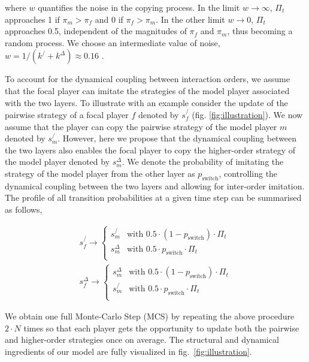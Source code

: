 \documentclass[a4paper,pre,reqno,superscriptaddress,twocolumn, floatfix]{revtex4}
\begin{document}
where $w$ quantifies the noise in the copying process. In the limit $w \rightarrow \infty$, $\Pi_t$ approaches 1 if $\pi_m > \pi_f$ and 0 if $\pi_f > \pi_m$. In the other limit $w \rightarrow 0$, $\Pi_t$ approaches 0.5, independent of the magnitudes of $\pi_f$ and $\pi_m$, thus becoming a random process. We choose an intermediate value of noise, $w = 1/(k^/ + k^{\Delta}) \approx 0.16$ \cite{nowak_emergence_2004, wu_universality_2010, allen_nonlinear_2024}.


To account for the dynamical coupling between interaction orders, we assume that the focal player can imitate the strategies of the model player associated with the two layers. To illustrate with an example consider the update of the pairwise strategy of a focal player $f$ denoted by $s_f^/$ (fig. \eqref{fig:illustration}). We now assume that the player can copy the pairwise strategy of the model player $m$ denoted by $s_m^/$. However, here we propose that the dynamical coupling between the two layers also enables the focal player to copy the higher-order strategy of the model player denoted by $s_m^{\Delta}$. We denote the probability of imitating the strategy of the model player from the other layer as $p_{\text{switch}}$, controlling the dynamical coupling between the two layers and allowing for inter-order imitation.
%
The profile of all transition probabilities at a given time step can be summarised as follows,


\begin{eqnarray}
 s_f^/ \rightarrow 
    \begin{cases}
    s_m^/& \text{with } 0.5\cdot (1-p_{\text{switch}})  \cdot \Pi_t\\
    s_m^{\Delta}& \text{with } 0.5\cdot p_{\text{switch}}  \cdot \Pi_t\\ 
    \end{cases}\\
s_f^{\Delta} \rightarrow 
    \begin{cases}
    s_m^{\Delta}& \text{with } 0.5\cdot (1-p_{\text{switch}})  \cdot \Pi_t\\
    s_m^/& \text{with } 0.5\cdot p_{\text{switch}}  \cdot \Pi_t\\
    \end{cases}
\end{eqnarray}


We obtain one full Monte-Carlo Step (MCS) by repeating the above procedure $2\cdot N$ times so that each player gets the opportunity to update both the pairwise and higher-order strategies once on average. The structural and dynamical ingredients of our model are fully visualized in fig.~\eqref{fig:illustration}.
\end{document}
